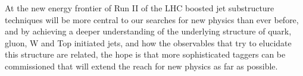 At the new energy frontier of Run II of the LHC boosted jet substructure techniques will be more central to our searches for new physics than ever before, and by achieving a deeper understanding of the underlying structure of quark, gluon, W and Top initiated jets, and how the observables that try to elucidate this structure are related, the hope is that more sophisticated taggers can be commissioned that will extend the reach for new physics as far as possible.




